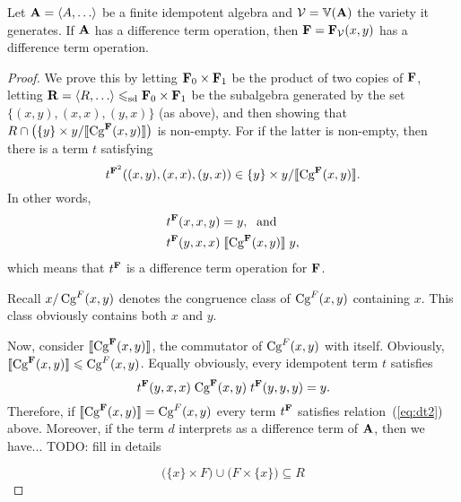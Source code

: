 \begin{theorem}
Let $\bA = \<A, \dots\>$ be a finite idempotent algebra and $\mathcal{V} = \operatorname{\mathbb{V}}(\mathbf{A})$ the
variety it generates.  If $\mathbf{A}$ has a difference term operation, then
$\mathbf{F} = \mathbf{F}_{\mathcal{V}}(x,y)$ has a difference term operation.
\end{theorem}
\begin{proof}
  
We prove this by 
letting $\mathbf{F}_0 \times \mathbf{F}_1$ be the product of two copies of $\mathbf{F}$,
letting $\bR = \<R, \dots\>  \sdp \bF_0 \times \bF_1$ be the subalgebra generated
by the set $\{(x, y), (x, x), (y, x)\}$ (as above), and then showing that
$R \cap \bigl(\{y\} \times y/\llbracket \operatorname{Cg}^{\mathbf{F}}(x,y) \rrbracket\bigr)$ is non-empty.  For if the latter is
non-empty, then there is a term $t$ satisfying
\[
t^{\mathbf{F}^2}((x,y),(x,x),(y,x)) \in  \{y\} \times y/\llbracket \operatorname{Cg}^{\mathbf{F}}(x,y) \rrbracket.
\]
In other words,
\begin{align}
t^{\mathbf{F}}(x,x,y) &= y, \; \text{ and }\label{eq:dt1}\\
t^{\mathbf{F}}(y,x,x) &\mathrel{\llbracket \operatorname{Cg}^{\mathbf{F}}(x,y) \rrbracket} y, \label{eq:dt2}
\end{align}
which means that $t^{\mathbf{F}}$ is a difference term operation for $\mathbf{F}$.

Recall $x/\operatorname{Cg}^{F}(x,y)$ denotes the congruence class of $\operatorname{Cg}^{F}(x,y)$
containing $x$. This class obviously contains both $x$ and $y$.

\bigskip

Now, consider $\llbracket \operatorname{Cg}^{\mathbf{F}}(x,y) \rrbracket$, the commutator of $\operatorname{Cg}^{F}(x,y)$ with itself.
Obviously, $\llbracket \operatorname{Cg}^{\mathbf{F}}(x,y) \rrbracket \leqslant \operatorname{Cg}^{F}(x,y)$.  
Equally obviously, every idempotent term $t$ satisfies
\[
t^{\mathbf{F}}(y,x,x) \mathrel{\operatorname{Cg}^{\mathbf{F}}(x,y)} t^{\mathbf{F}}(y,y,y) = y.
\]
Therefore,
if $\llbracket \operatorname{Cg}^{\mathbf{F}}(x,y) \rrbracket = \operatorname{Cg}^{F}(x,y)$  
every term  $t^{\mathbf{F}}$ satisfies relation~(\ref{eq:dt2}) above.
Moreover, if the term $d$ interprets as a difference term of $\mathbf{A}$, then we
have...  TODO: fill in details

\bigskip



\[
\bigl( \{x\} \times F\bigr) \cup \bigl(F \times \{x\}\bigr) \subseteq R
\]

\end{proof}

\newpage



\bigskip


